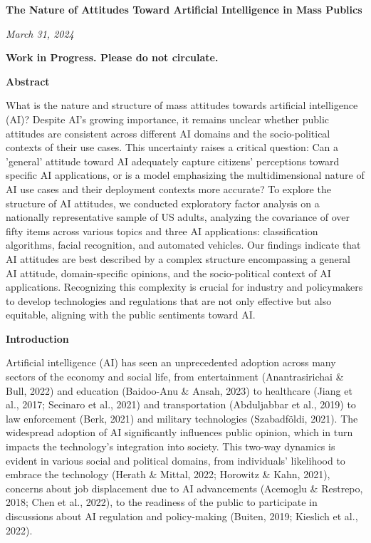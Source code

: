\textbf{The Nature of Attitudes Toward Artificial Intelligence in Mass Publics}

\noindent{}

\textit{March 31, 2024}

\textbf{Work in Progress. Please do not circulate.}

\textbf{Abstract}

What is the nature and structure of mass attitudes towards artificial intelligence (AI)? Despite AI's growing importance, it remains unclear whether public attitudes are consistent across different AI domains and the socio-political contexts of their use cases. This uncertainty raises a critical question: Can a 'general' attitude toward AI adequately capture citizens' perceptions toward specific AI applications, or is a model emphasizing the multidimensional nature of AI use cases and their deployment contexts more accurate? To explore the structure of AI attitudes, we conducted exploratory factor analysis on a nationally representative sample of US adults, analyzing the covariance of over fifty items across various topics and three AI applications: classification algorithms, facial recognition, and automated vehicles. Our findings indicate that AI attitudes are best described by a complex structure encompassing a general AI attitude, domain-specific opinions, and the socio-political context of AI applications. Recognizing this complexity is crucial for industry and policymakers to develop technologies and regulations that are not only effective but also equitable, aligning with the public sentiments toward AI.

\textbf{Introduction}

Artificial intelligence (AI) has seen an unprecedented adoption across many sectors of the economy and social life, from entertainment (Anantrasirichai \& Bull, 2022) and education (Baidoo-Anu \& Ansah, 2023) to healthcare (Jiang et al., 2017; Secinaro et al., 2021) and transportation (Abduljabbar et al., 2019) to law enforcement (Berk, 2021) and military technologies (Szabadföldi, 2021). The widespread adoption of AI significantly influences public opinion, which in turn impacts the technology's integration into society. This two-way dynamics is evident in various social and political domains, from individuals' likelihood to embrace the technology (Herath \& Mittal, 2022; Horowitz \& Kahn, 2021), concerns about job displacement due to AI advancements (Acemoglu \& Restrepo, 2018; Chen et al., 2022), to the readiness of the public to participate in discussions about AI regulation and policy-making (Buiten, 2019; Kieslich et al., 2022). 

